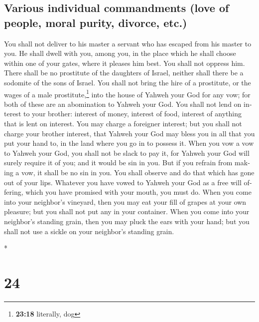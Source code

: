 \begin{paracol}{2}
\begin{otherlanguage}{english}
\hypertarget{various-individual-commandments-love-of-people-moral-purity-divorce-etc.}{%
\subsection{Various individual commandments (love of people, moral
purity, divorce,
etc.)}\label{various-individual-commandments-love-of-people-moral-purity-divorce-etc.}}

 You shall not deliver to his master a servant who has
escaped from his master to you.  He shall dwell with you,
among you, in the place which he shall choose within one of your gates,
where it pleases him best. You shall not oppress him. 
There shall be no prostitute of the daughters of Israel, neither shall
there be a sodomite of the sons of Israel.  You shall not
bring the hire of a prostitute, or the wages of a male
prostitute,\footnote{\textbf{23:18} literally, dog} into the house of
Yahweh your God for any vow; for both of these are an abomination to
Yahweh your God.  You shall not lend on interest to your
brother: interest of money, interest of food, interest of anything that
is lent on interest.  You may charge a foreigner
interest; but you shall not charge your brother interest, that Yahweh
your God may bless you in all that you put your hand to, in the land
where you go in to possess it.  When you vow a vow to
Yahweh your God, you shall not be slack to pay it, for Yahweh your God
will surely require it of you; and it would be sin in you.
 But if you refrain from making a vow, it shall be no sin
in you.  You shall observe and do that which has gone out
of your lips. Whatever you have vowed to Yahweh your God as a free will
offering, which you have promised with your mouth, you must do.
 When you come into your neighbor's vineyard, then you
may eat your fill of grapes at your own pleasure; but you shall not put
any in your container.  When you come into your
neighbor's standing grain, then you may pluck the ears with your hand;
but you shall not use a sickle on your neighbor's standing grain.

\end{otherlanguage}

\switchcolumn[0]*

\hypertarget{section-46}{%
\section{24}\label{section-46}}


\end{paracol}
